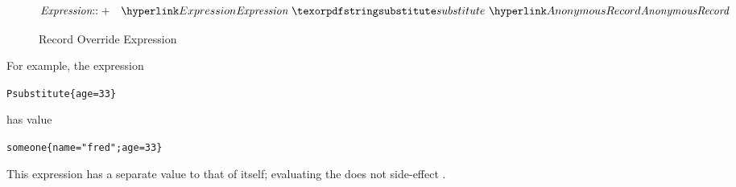 \begin{figure}[htbp]
\begin{eqnarray*}
\emph{Expression}&\arrowplus&\ntRef{Expression}\ \q{substitute}\ \ntRef{AnonymousRecord}
\end{eqnarray*}
\caption{Record Override Expression}\label{recordOverrideFig}
\end{figure}

For example, the expression
\begin{alltt}
P substitute \{age=33\}
\end{alltt}
has value
\begin{alltt}
someone\{name="fred"; age=33\}
\end{alltt}
\begin{aside}
This expression has a separate value to that of  itself; evaluating the  does not side-effect .
\end{aside}

